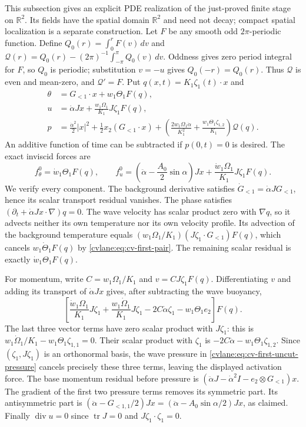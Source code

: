 This subsection gives an explicit PDE realization of the just-proved
finite stage on $\mathbb R^2$. Its fields have the spatial domain
$\mathbb R^2$ and need not decay; compact spatial localization is a
separate construction. Let $F$ be any smooth odd $2\pi$-periodic
function. Define $Q_0(r)=\int_0^rF(v)\,dv$ and
$\mathcal Q(r)=Q_0(r)-(2\pi)^{-1}\int_{-\pi}^{\pi}Q_0(v)\,dv$.
Oddness gives zero period integral for $F$, so $Q_0$ is periodic;
substitution $v=-u$ gives $Q_0(-r)=Q_0(r)$. Thus $\mathcal Q$ is
even and mean-zero, and $\mathcal Q'=F$.
Put $q(x,t)=K_1\zeta_1(t)\cdot x$ and
\begin{align}
 \theta&=G_{<1}\cdot x+w_1\Theta_1F(q),\nonumber\\
 u&=\dot\alpha Jx+\frac{w_1\Omega_1}{K_1}J\zeta_1F(q),
 \label{cvlane:eq:cv-first-uncut-fields}\\
 p&=\frac{\dot\alpha^2}2|x|^2
      +\frac12x_2(G_{<1}\cdot x)
      +\left(\frac{2w_1\Omega_1\dot\alpha}{K_1^2}
             +\frac{w_1\Theta_1\zeta_{1,2}}{K_1}\right)\mathcal Q(q).
 \label{cvlane:eq:cv-first-uncut-pressure}
\end{align}
An additive function of time can be subtracted if $p(0,t)=0$ is desired.
The exact inviscid forces are
\begin{equation}
 f_\theta^0=\dot w_1\Theta_1F(q),\qquad
 f_u^0=\left(\ddot\alpha-\frac{A_0}2\sin\alpha\right)Jx
                   +\frac{\dot w_1\Omega_1}{K_1}J\zeta_1F(q).
 \label{cvlane:eq:cv-first-uncut-forces}
\end{equation}
We verify every component. The background derivative satisfies
$\dot G_{<1}=\dot\alpha JG_{<1}$, hence its scalar transport
residual vanishes. The phase satisfies
$(\partial_t+\dot\alpha Jx\cdot\nabla)q=0$.
The wave velocity has scalar product zero with $\nabla q$, so it
advects neither its own temperature nor its own velocity profile.
Its advection of the background temperature equals
$(w_1\Omega_1/K_1)(J\zeta_1\cdot G_{<1})F(q)$,
which cancels $w_1\dot\Theta_1F(q)$ by
\eqref{cvlane:eq:cv-first-pair}. The remaining scalar residual is exactly
$\dot w_1\Theta_1F(q)$.

For momentum, write $C=w_1\Omega_1/K_1$ and
$v=CJ\zeta_1F(q)$. Differentiating $v$ and adding its transport
of $\dot\alpha Jx$ gives, after subtracting the wave buoyancy,
\[
 \left[\frac{\dot w_1\Omega_1}{K_1}J\zeta_1
   +\frac{w_1\dot\Omega_1}{K_1}J\zeta_1
   -2C\dot\alpha\zeta_1-w_1\Theta_1e_2\right]F(q).
\]
The last three vector terms have zero scalar product with $J\zeta_1$:
this is $w_1\dot\Omega_1/K_1-w_1\Theta_1\zeta_{1,1}=0$.
Their scalar product with $\zeta_1$ is
$-2C\dot\alpha-w_1\Theta_1\zeta_{1,2}$.
Since $(\zeta_1,J\zeta_1)$ is an orthonormal basis, the wave pressure
in \eqref{cvlane:eq:cv-first-uncut-pressure} cancels precisely these three
terms, leaving the displayed activation force. The base momentum
residual before pressure is
$(\ddot\alpha J-\dot\alpha^2I-e_2\otimes G_{<1})x$.
The gradient of the first two pressure terms removes its symmetric
part. Its antisymmetric part is
$(\ddot\alpha-G_{<1,1}/2)Jx
=(\ddot\alpha-A_0\sin\alpha/2)Jx$, as claimed.
Finally $\operatorname{div}u=0$ since $\operatorname{tr}J=0$
and $J\zeta_1\cdot\zeta_1=0$.

